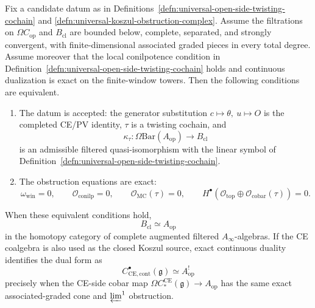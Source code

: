 \begin{thm}
\label{thm:universal-filtered-cobar-recognition}
  Fix a candidate datum as in
  Definitions~\ref{defn:universal-open-side-twisting-cochain} and
  \ref{defn:universal-koszul-obstruction-complex}.  Assume the
  filtrations on \(\Omega C_{\mathrm{op}}\) and \(B_{\mathrm{cl}}\) are
  bounded below, complete, separated, and strongly convergent, with
  finite-dimensional associated graded pieces in every total degree.
  Assume moreover that the local conilpotence condition in
  Definition~\ref{defn:universal-open-side-twisting-cochain} holds and
  continuous dualization is exact on the finite-window towers.
  Then the following conditions are equivalent.
  \begin{enumerate}[label=(A\arabic*)]
    \item The datum is accepted: the generator substitution
      \(c\mapsto\theta,\ u\mapsto O\) is the completed CE/PV identity,
      \(\tau\) is a twisting cochain, and
      \[
        \kappa_\tau\colon
        \Omega\mathrm{Bar}(A_{\mathrm{op}})
        \longrightarrow B_{\mathrm{cl}}
      \]
      is an admissible filtered quasi-isomorphism with the linear symbol
      of Definition~\ref{defn:universal-open-side-twisting-cochain}.
    \item The obstruction equations are exact:
      \[
        \omega_{\mathrm{win}}=0,\qquad
        \mathcal O_{\mathrm{conilp}}=0,\qquad
        \mathcal O_{\mathrm{MC}}(\tau)=0,\qquad
        H^\bullet\!\left(
          \mathcal O_{\mathrm{top}}
          \oplus
          \mathcal O_{\mathrm{cobar}}(\tau)
        \right)=0 .
      \]
  \end{enumerate}
  When these equivalent conditions hold,
  \[
    B_{\mathrm{cl}}
      \simeq
    A_{\mathrm{op}}
  \]
  in the homotopy category of complete augmented filtered
  \(A_\infty\)-algebras.  If the CE coalgebra is also used as the closed
  Koszul source, exact continuous duality identifies the dual form as
  \[
    C^\bullet_{\mathrm{CE},\mathrm{cont}}(\mathfrak g)
      \simeq
    A_{\mathrm{op}}^!
  \]
  precisely when the CE-side cobar map
  \(\Omega C_*^{\mathrm{CE}}(\mathfrak g)\to A_{\mathrm{op}}\) has the
  same exact associated-graded cone and \(\varprojlim^1\) obstruction.
\end{thm}

